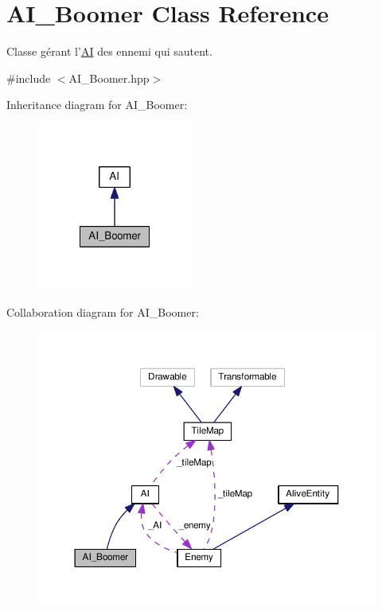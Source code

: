 \hypertarget{class_a_i___boomer}{\section{A\+I\+\_\+\+Boomer Class Reference}
\label{class_a_i___boomer}
}


Classe gérant l'\hyperlink{class_a_i}{A\+I} des ennemi qui sautent.  




{\ttfamily \#include $<$A\+I\+\_\+\+Boomer.\+hpp$>$}



Inheritance diagram for A\+I\+\_\+\+Boomer\+:
\nopagebreak
\begin{figure}[H]
\begin{center}
\leavevmode
\includegraphics[width=144pt]{class_a_i___boomer__inherit__graph}
\end{center}
\end{figure}


Collaboration diagram for A\+I\+\_\+\+Boomer\+:
\nopagebreak
\begin{figure}[H]
\begin{center}
\leavevmode
\includegraphics[width=350pt]{class_a_i___boomer__coll__graph}
\end{center}
\end{figure}
